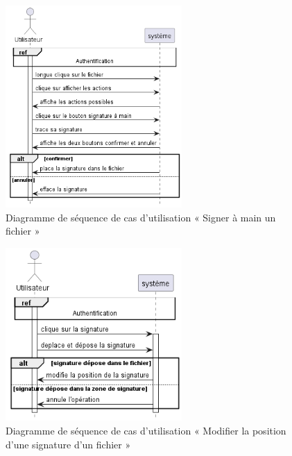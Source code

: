 \begin{figure}[H]
  \centering
  \includegraphics[width=0.6\textwidth]{out/diagrams/sprint4/sign_by_hand/sign_by_hand}
  \caption{Diagramme de séquence de cas d'utilisation « Signer à main un fichier   »}
  \label{fig:sequence_sign_by_hand}
\end{figure}
\begin{figure}[H]
  \centering
  \includegraphics[width=0.6\textwidth]{out/diagrams/sprint4/move_signature/move_signature}
  \caption{Diagramme de séquence de cas d'utilisation « Modifier la position d'une signature d'un fichier »}
  \label{fig:sequence_move_signature}
\end{figure}

